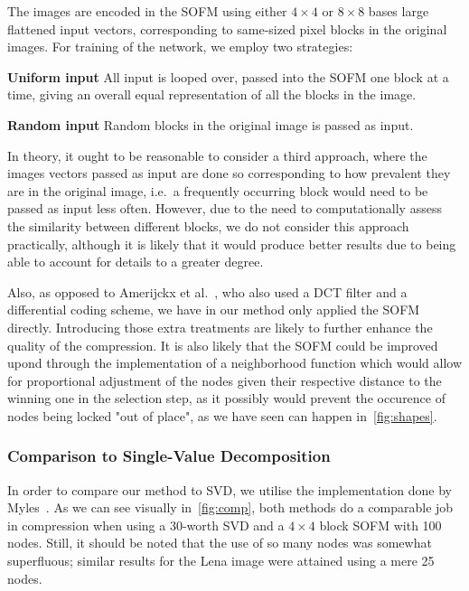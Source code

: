 \documentclass[10pt, twocolumn]{article}\usepackage[]{graphicx}\usepackage[]{color}
\theoremstyle{plain}
\newcommand{\kh}{SOFM\xspace}
\begin{document}
  The images are encoded in the \kh using either $4 \times 4$ or $8 \times 8$ bases large flattened input vectors, corresponding to same-sized pixel blocks in the original images. For training of the network, we employ two strategies: 
  \begin{description}
    \item{\bf Uniform input} All input is looped over, passed into the \kh one block at a time, giving an overall equal representation of all the blocks in the image. 
    \item{\bf Random input} Random blocks in the original image is passed as input. 
  \end{description}
  
  In theory, it ought to be reasonable to consider a third approach, where the images vectors passed as input are done so corresponding to how prevalent they are in the original image, i.e.\ a frequently occurring block would need to be passed as input less often. However, due to the need to computationally assess the similarity between different blocks, we do not consider this approach practically, although it is likely that it would produce better results due to being able to account for details to a greater degree. 
  
  Also, as opposed to Amerijckx et al.~\cite{koh_img_comp}, who also used a DCT filter and a differential coding scheme, we have in our method only applied the \kh directly. Introducing those extra treatments are likely to further enhance the quality of the compression. It is also likely that the SOFM could be improved upond through the implementation of a neighborhood function which would allow for proportional adjustment of the nodes given their respective distance to the winning one in the selection step, as it possibly would prevent the occurence of nodes being locked "out of place", as we have seen can happen in~\cref{fig:shapes}. 

    \subsubsection{Comparison to Single-Value Decomposition}
      In order to compare our method to SVD, we utilise the implementation done by Myles~\cite{svd}. As we can see visually in~\cref{fig:comp}, both methods do a comparable job in compression when using a 30-worth SVD and a $4 \times 4$ block SOFM with 100 nodes. Still, it should be noted that the use of so many nodes was somewhat superfluous; similar results for the Lena image were attained using a mere 25 nodes. 
  
\end{document}
